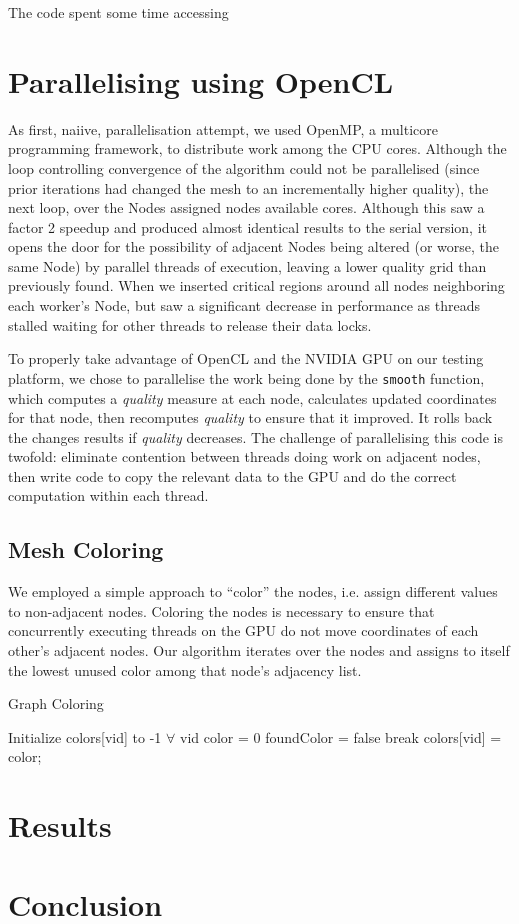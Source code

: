 \documentclass[a4paper,11pt, twocolumn]{article}
\begin{document}
The code spent some time accessing 

\section{Parallelising using OpenCL}
As first, naiive, parallelisation attempt, we used OpenMP, a multicore programming framework, to distribute work among the CPU cores.  Although the loop controlling convergence of the algorithm could not be parallelised (since prior iterations had changed the mesh to an incrementally higher quality), the next loop, over the Nodes assigned nodes available cores.  Although this saw a factor 2 speedup and produced almost identical results to the serial version, it opens the door for the possibility of adjacent Nodes being altered (or worse, the same Node) by parallel threads of execution, leaving a lower quality grid than previously found.  When we inserted critical regions around all nodes neighboring each worker's Node, but saw a significant decrease in performance as threads stalled waiting for other threads to release their data locks.

To properly take advantage of OpenCL and the NVIDIA GPU on our testing platform, we chose to parallelise the work being done by the \verb+smooth+ function, which computes a \emph{quality} measure at each node, calculates updated coordinates for that node, then recomputes \emph{quality} to ensure that it improved.  It rolls back the changes results if \emph{quality} decreases.  The challenge of parallelising this code is twofold: eliminate contention between threads doing work on adjacent nodes, then write code to copy the relevant data to the GPU and do the correct computation within each thread.

\subsection{Mesh Coloring}
We employed a simple approach to ``color'' the nodes, i.e. assign different values to non-adjacent nodes.  Coloring the nodes is necessary to ensure that concurrently executing threads on the GPU do not move coordinates of each other's adjacent nodes.  Our algorithm iterates over the nodes and assigns to itself the lowest unused color among that node's adjacency list.
\begin{algorithm}[H]
\caption{Graph Coloring}
\label{al:color}
\begin{algorithmic}[1]
\STATE Initialize colors[vid] to -1 $\forall$ vid
  \STATE color = 0
      \STATE foundColor = false
      \STATE break
    \ENDIF
  \ENDFOR
  \STATE colors[vid] = color;
\ENDFOR
\end{algorithmic}
\end{algorithm}

\section{Results}
\section{Conclusion}


\end{document}

